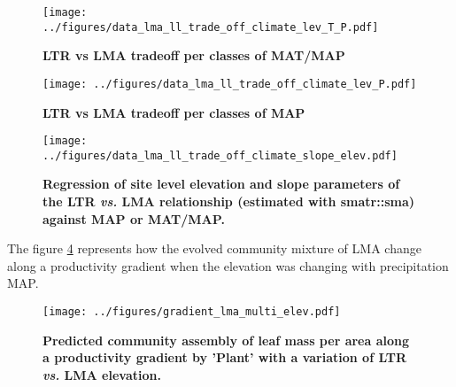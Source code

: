 \documentclass[a4paper,11pt]{article}
\begin{document}
\begin{figure}[ht]
\centering
\texttt{[image: ../figures/data\_lma\_ll\_trade\_off\_climate\_lev\_T\_P.pdf]}
\caption{\textbf{LTR vs LMA tradeoff per classes of MAT/MAP}
\label{fig:MAT_MAP}}
\end{figure}


\begin{figure}[ht]
\centering
\texttt{[image: ../figures/data\_lma\_ll\_trade\_off\_climate\_lev\_P.pdf]}
\caption{\textbf{LTR vs LMA tradeoff per classes of MAP}
\label{fig:MAP}}
\end{figure}

\begin{figure}[ht]
\centering
\texttt{[image: ../figures/data\_lma\_ll\_trade\_off\_climate\_slope\_elev.pdf]}
\caption{\textbf{Regression of site level elevation and slope parameters of the LTR \textit{vs.} LMA relationship (estimated with smatr::sma) against MAP or MAT/MAP. }
\label{fig:elev_slope}}
\end{figure}




\clearpage

The figure \ref{fig:lma_map} represents how the evolved community mixture of LMA change along a productivity gradient when the elevation was changing with precipitation MAP.

\begin{figure}[ht]
\centering
\texttt{[image: ../figures/gradient\_lma\_multi\_elev.pdf]}
\caption{\textbf{Predicted community assembly of leaf mass per area along a productivity gradient by 'Plant' with a variation of LTR \textit{vs.} LMA elevation.}
\label{fig:lma_map}}
\end{figure}
\end{document}
